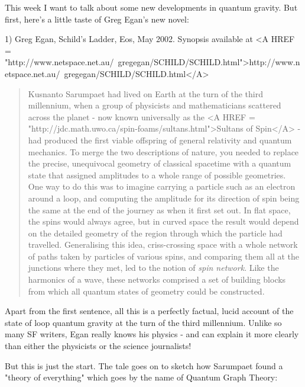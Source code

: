 



This week I want to talk about some new developments in quantum 
gravity.  But first, here's a little taste of Greg Egan's new novel:


 1) Greg Egan, Schild's Ladder, Eos, May 2002.  Synopsis available
at <A HREF = "http://www.netspace.net.au/~gregegan/SCHILD/SCHILD.html">http://www.netspace.net.au/~gregegan/SCHILD/SCHILD.html</A>

\begin{quote}
    Kusnanto Sarumpaet had lived on Earth at the turn of the
    third millennium, when a group of physicists and mathematicians
    scattered across the planet - now known universally as the 
    <A HREF = "http://jdc.math.uwo.ca/spin-foams/sultans.html">Sultans of Spin</A> - had produced the first viable offspring of
    general relativity and quantum mechanics.  To merge the two
    descriptions of nature, you needed to replace the precise,
    unequivocal geometry of classical spacetime with a quantum 
    state that assigned amplitudes to a whole range of possible
    geometries.  One way to do this was to imagine carrying a
    particle such as an electron around a loop, and computing 
    the amplitude for its direction of spin being the same at the
    end of the journey as when it first set out.  In flat space,
    the spins would always agree, but in curved space the result
    would depend on the detailed geometry of the region through
    which the particle had travelled.  Generalising this idea, 
    criss-crossing space with a whole network of paths taken by
    particles of various spins, and comparing them all at the 
    junctions where they met, led to the notion of \emph{spin network}.
    Like the harmonics of a wave, these networks comprised a set  
    of building blocks from which all quantum states of geometry
    could be constructed.
\end{quote}

Apart from the first sentence, all this is a perfectly factual, lucid
account of the state of loop quantum gravity at the turn of the third
millennium.  Unlike so many SF writers, Egan really knows his physics -
and can explain it more clearly than either the physicists or the
science journalists!  

But this is just the start.  The tale goes on to sketch how Sarumpaet
found a "theory of everything" which goes by the name of
Quantum Graph Theory:


